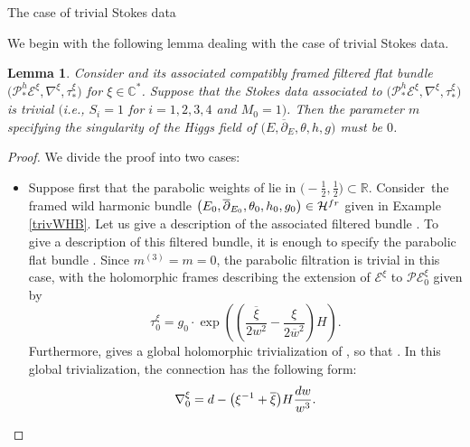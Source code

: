 \documentclass[11pt]{article}
\numberwithin{equation}{section}
\newtheorem{Lemma}[Theorem]{Lemma}
\numberwithin{equation}{section}
\begin{document}
\begin{subsubsection}{The case of trivial Stokes data}

We begin with the following lemma dealing with the case of trivial Stokes data.

\begin{Lemma}\label{m=0} Consider  and its associated compatibly framed filtered flat bundle $\bigl(\mathcal{P}^{h}_*\mathcal{E}^{\xi},\nabla^{\xi},\tau_*^{\xi}\bigr)$ for $\xi \in \mathbb{C}^*$. Suppose that the Stokes data associated to $\bigl(\mathcal{P}^{h}_*\mathcal{E}^{\xi},\nabla^{\xi},\tau_*^{\xi}\bigr)$ is trivial $($i.e., $S_i=1$ for $i=1,2,3,4$ and $M_0=1)$. Then the parameter $m$ specifying the singularity of the Higgs field of $\bigl(E,\overline{\partial}_E,\theta,h,g\bigr)$ must be $0$.
\end{Lemma}

\begin{proof}We divide the proof into two cases:
\begin{itemize}\itemsep=0pt
 \item Suppose first that the parabolic weights of  lie in $\bigl(-\frac12,\frac12\bigr)\subset \mathbb{R}$. Con\-sider~the framed wild harmonic bundle $\bigl(E_0,\overline{\partial}_{E_0},\theta_0,h_0,g_0\bigr) \in \mathcal{H}^{{\rm fr}}$ given in Example \ref{trivWHB}. Let us give a description of the associated filtered bundle . To give a description of this filtered bundle, it is enough to specify the parabolic flat bundle . Since $m^{(3)}=m=0$, the parabolic filtration is trivial in this case, with the holomorphic frames describing the extension of $\mathcal{E}^{\xi}$ to $\mathcal{PE}_0^{\xi}$ given by
 \[
 \tau_0^{\xi}=g_0\cdot \exp \left(\left(\frac{\overline{\xi}}{2w^2}-\frac{\xi}{2\overline{w}^{2}}\right)H\right).
 \]
 Furthermore,  gives a global holomorphic trivialization of , so that . In this global trivialization, the connection has the following form:
\begin{equation*}
 \nabla^{\xi}_0={\rm d}-\bigl(\xi^{-1}+\overline{\xi}\bigr)H\frac{{\rm d}w}{w^3}.
\end{equation*}


\end{itemize}
\end{proof}
\end{subsubsection}
\end{document}
